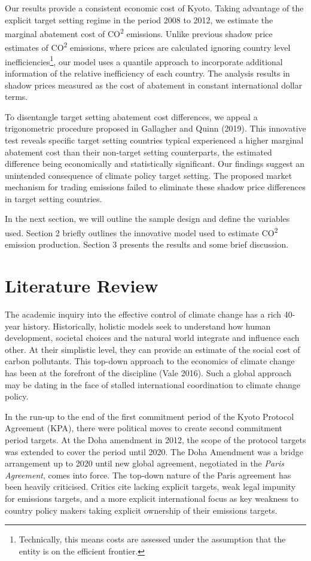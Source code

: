 \documentclass[
  10pt,
]{article}
\begin{document}
Our results provide a consistent economic cost of Kyoto. Taking
advantage of the explicit target setting regime in the period 2008 to
2012, we estimate the marginal abatement cost of CO\textsuperscript{2}
emissions. Unlike previous shadow price estimates of
CO\textsuperscript{2} emissions, where prices are calculated ignoring
country level inefficiencies\footnote{Technically, this means costs are
  assessed under the assumption that the entity is on the efficient
  frontier.}, our model uses a quantile approach to incorporate
additional information of the relative inefficiency of each country. The
analysis results in shadow prices measured as the cost of abatement in
constant international dollar terms.

To disentangle target setting abatement cost differences, we appeal a
trigonometric procedure proposed in Gallagher and Quinn (2019). This
innovative test reveals specific target setting countries typical
experienced a higher marginal abatement cost than their non-target
setting counterparts, the estimated difference being economically and
statistically significant. Our findings suggest an unintended
consequence of climate policy target setting. The proposed market
mechanism for trading emissions failed to eliminate these shadow price
differences in target setting countries.

In the next section, we will outline the sample design and define the
variables used. Section 2 briefly outlines the innovative model used to
estimate CO\textsuperscript{2} emission production. Section 3 presents
the results and some brief discussion.

\hypertarget{literature-review}{%
\section{Literature Review}\label{literature-review}}

The academic inquiry into the effective control of climate change has a
rich 40-year history. Historically, holistic models seek to understand
how human development, societal choices and the natural world integrate
and influence each other. At their simplistic level, they can provide an
estimate of the social cost of carbon pollutants. This top-down approach
to the economics of climate change has been at the forefront of the
discipline (Vale 2016). Such a global approach may be dating in the face
of stalled international coordination to climate change policy.

In the run-up to the end of the first commitment period of the Kyoto
Protocol Agreement (KPA), there were political moves to create second
commitment period targets. At the Doha amendment in 2012, the scope of
the protocol targets was extended to cover the period until 2020. The
Doha Amendment was a bridge arrangement up to 2020 until new global
agreement, negotiated in the \emph{Paris Agreement}, comes into force.
The top-down nature of the Paris agreement has been heavily criticised.
Critics cite lacking explicit targets, weak legal impunity for emissions
targets, and a more explicit international focus as key weakness to
country policy makers taking explicit ownership of their emissions
targets.
\end{document}
